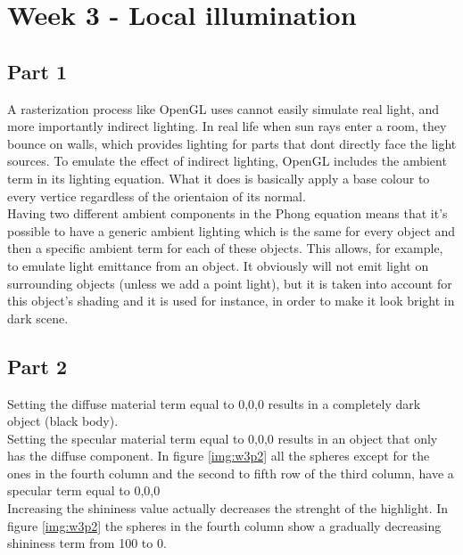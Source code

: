 \chapter{Week 3 - Local illumination}

\section{Part 1}

A rasterization process like OpenGL uses cannot easily simulate real light, and
more importantly indirect lighting. In real life when sun rays enter a room, they
bounce on walls, which provides lighting for parts that dont directly face the light
sources. To emulate the effect of indirect lighting, OpenGL includes the ambient
term in its lighting equation. What it does is basically apply a base colour to
every vertice regardless of the orientaion of its normal. \\
Having two different ambient components in the Phong equation means that it's possible to have a generic ambient lighting which
is the same for every object and then a specific ambient term for each of these objects. This allows, for example, to emulate
light emittance from an object. It obviously will not emit light on surrounding objects (unless we add a point light), but it is taken into account for this object's shading and it is used for instance, in order to make it look bright in dark scene. 

\section{Part 2}

Setting the diffuse material term equal to 0,0,0 results in a completely dark object (black body).\\ 
Setting the specular material term equal to 0,0,0 results in an object that only has the diffuse component. In figure \ref{img:w3p2} all the spheres except for the ones in the fourth column and the second to fifth row of the third column, have a specular term equal to 0,0,0\\
Increasing the shininess value actually decreases the strenght of the highlight. In figure \ref{img:w3p2} the spheres in the fourth column show a 
gradually decreasing shininess term from 100 to 0. 


